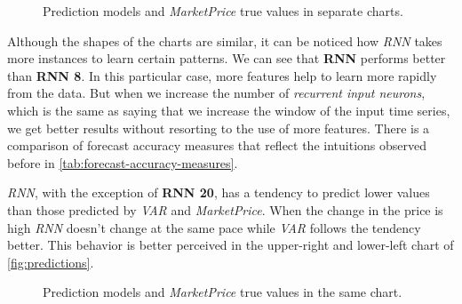 \begin{figure}[bth]
  \caption{Prediction models and \textit{MarketPrice} true values in
    separate charts.}
  \label{fig:predictions-subplots}
\end{figure}

Although the shapes of the charts are similar, it can be noticed how
\textit{RNN} takes more instances to learn certain patterns. We can
see that \textbf{RNN} performs better than \textbf{RNN 8}. In this
particular case, more features help to learn more rapidly from the
data. But when we increase the number of \textit{recurrent input
  neurons}, which is the same as saying that we increase the window of
the input time series, we get better results without resorting to the
use of more features. There is a comparison of forecast accuracy
measures that reflect the intuitions observed before in
\autoref{tab:forecast-accuracy-measures}.

\textit{RNN}, with the exception of \textbf{RNN 20}, has a tendency to
predict lower values than those predicted by \textit{VAR} and
\textit{MarketPrice}. When the change in the price is high
\textit{RNN} doesn't change at the same pace while \textit{VAR}
follows the tendency better. This behavior is better perceived in the
upper-right and lower-left chart of \autoref{fig:predictions}.

\begin{figure}[bth]
  \caption{Prediction models and \textit{MarketPrice} true values in
    the same chart.}
  \label{fig:predictions}
\end{figure}

